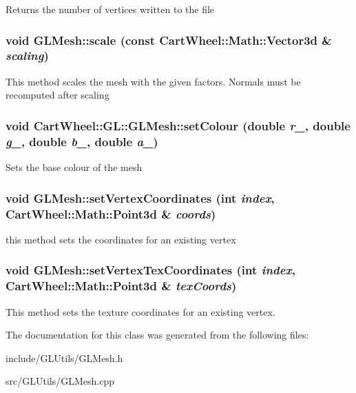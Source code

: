 Returns the number of vertices written to the file \hypertarget{classCartWheel_1_1GL_1_1GLMesh_a7e4f0e6b6c3e2979f614104c35e52465}{
\subsubsection[{scale}]{\setlength{\rightskip}{0pt plus 5cm}void GLMesh::scale (const {\bf CartWheel::Math::Vector3d} \& {\em scaling})}}
\label{classCartWheel_1_1GL_1_1GLMesh_a7e4f0e6b6c3e2979f614104c35e52465}
This method scales the mesh with the given factors. Normals must be recomputed after scaling \hypertarget{classCartWheel_1_1GL_1_1GLMesh_a21c06f0dc9057d5787053e9513ef44ff}{
\subsubsection[{setColour}]{\setlength{\rightskip}{0pt plus 5cm}void CartWheel::GL::GLMesh::setColour (double {\em r\_\-}, \/  double {\em g\_\-}, \/  double {\em b\_\-}, \/  double {\em a\_\-})}}
\label{classCartWheel_1_1GL_1_1GLMesh_a21c06f0dc9057d5787053e9513ef44ff}
Sets the base colour of the mesh \hypertarget{classCartWheel_1_1GL_1_1GLMesh_a0c19ba9f7d8c236eef920ff8c6ef70e4}{
\subsubsection[{setVertexCoordinates}]{\setlength{\rightskip}{0pt plus 5cm}void GLMesh::setVertexCoordinates (int {\em index}, \/  {\bf CartWheel::Math::Point3d} \& {\em coords})}}
\label{classCartWheel_1_1GL_1_1GLMesh_a0c19ba9f7d8c236eef920ff8c6ef70e4}
this method sets the coordinates for an existing vertex \hypertarget{classCartWheel_1_1GL_1_1GLMesh_ae0fbe2fed3988a3ac01783de3db873ce}{
\subsubsection[{setVertexTexCoordinates}]{\setlength{\rightskip}{0pt plus 5cm}void GLMesh::setVertexTexCoordinates (int {\em index}, \/  {\bf CartWheel::Math::Point3d} \& {\em texCoords})}}
\label{classCartWheel_1_1GL_1_1GLMesh_ae0fbe2fed3988a3ac01783de3db873ce}
This method sets the texture coordinates for an existing vertex. 

The documentation for this class was generated from the following files:\begin{DoxyCompactItemize}
\item 
include/GLUtils/GLMesh.h\item 
src/GLUtils/GLMesh.cpp\end{DoxyCompactItemize}
